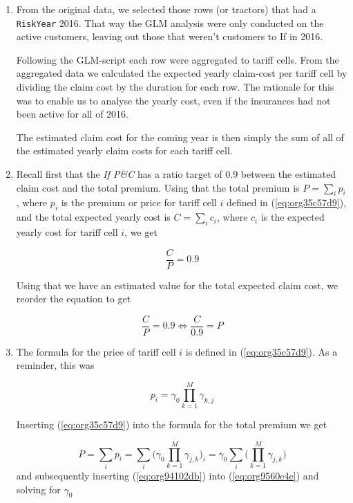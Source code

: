 \documentclass[11pt]{article}
\begin{document}
\begin{enumerate}
\item From the original data, we selected those rows (or tractors) that had a \texttt{RiskYear} 2016. That 
way the GLM analysis were only conducted on the active customers, leaving out those that weren't 
customers to If in 2016. 

Following the GLM-script each row were aggregated to tariff cells.
From the aggregated data we calculated the expected yearly claim-cost per tariff cell by dividing the
claim cost by the duration for each row. The rationale for this was to enable us to analyse the 
yearly cost, even if the insurances had not been active for all of 2016. 

The estimated claim cost for the coming year is then simply the sum of all of the estimated yearly 
claim costs for each tariff cell.

\item Recall first that the \emph{If P\&C} has a ratio target of 0.9 between the estimated claim cost and the total premium.
Using that the total premium is \(P = \sum_i p_i\), where \(p_i\) is the premium or price for tariff cell \(i\) defined 
in (\ref{eq:org35c57d9}), and the total expected yearly cost is \(C = \sum_i c_i\), where \(c_i\) is the expected yearly cost 
for tariff cell \(i\), we get

\begin{equation}
\label{eq:org1ef599b}
  \frac{C}{P} = 0.9 
\end{equation}

Using that we have an estimated value for the total expected claim cost, we reorder the equation to get

\begin{equation}
\label{eq:org9560e4e}
\frac{C}{P} = 0.9 \iff \frac{C}{0.9} = P
\end{equation}

\item The formula for the price of tariff cell \(i\) is defined in (\ref{eq:org35c57d9}). As a reminder, this was

\[
      p_i = \gamma_0 \prod_{k = 1}^M \gamma_{k,j}
      \]

Inserting (\ref{eq:org35c57d9}) into the formula for the total premium we get

\begin{equation}
\label{eq:org94102db}
P = \sum_i p_i = \sum_i \bigg (\gamma_0 \prod_{k = 1}^M \gamma_{j,k} \bigg)_i =  \gamma_0 \sum_i \bigg ( \prod_{k = 1}^M \gamma_{j,k} \bigg)
\end{equation}
and subsequently inserting (\ref{eq:org94102db}) into (\ref{eq:org9560e4e}) and solving for \(\gamma_0\) 


\end{enumerate}
\end{document}
